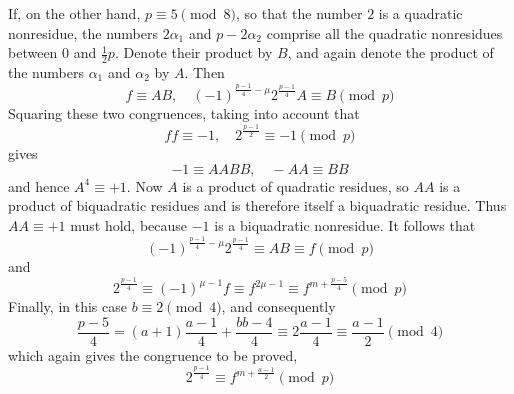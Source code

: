 If, on the other hand, $p\equiv5\pmod8$, so that the number $2$ is a quadratic nonresidue, the numbers $2\alpha_1$ and $p-2\alpha_2$ comprise all the quadratic nonresidues between $0$ and $\frac12p$. Denote their product by $B$, and again denote the product of the numbers $\alpha_1$ and $\alpha_2$ by $A$. Then
\[
f\equiv AB,\quad(-1)^{\frac{p-1}4-\mu}2^{\frac{p-1}4}A\equiv B\pmod p
\]
Squaring these two congruences, taking into account that
\[
ff\equiv-1,\quad2^{\frac{p-1}2}\equiv-1\pmod p
\]
gives
\[
-1\equiv AABB,\quad-AA\equiv BB
\]
and hence $A^4\equiv+1$. Now $A$ is a product of quadratic residues, so $AA$ is a product of biquadratic residues and is therefore itself a biquadratic residue. Thus $AA\equiv+1$ must hold, because $-1$ is a biquadratic nonresidue. It follows that
\[
(-1)^{\frac{p-1}4-\mu}2^{\frac{p-1}4}\equiv AB\equiv f\pmod p
\]
and
\[
2^{\frac{p-1}4}\equiv(-1)^{\mu-1}f\equiv f^{2\mu-1}\equiv f^{m+\frac{p-5}4}\pmod p
\]
Finally, in this case $b\equiv2\pmod4$, and consequently
\[
\frac{p-5}4=(a+1)\frac{a-1}4+\frac{bb-4}4\equiv2\frac{a-1}4\equiv\frac{a-1}2\pmod4
\]
which again gives the congruence to be proved,
\[
2^{\frac{p-1}4}\equiv f^{m+\frac{a-1}2}\pmod p
\]
\BookRule{35mm}

